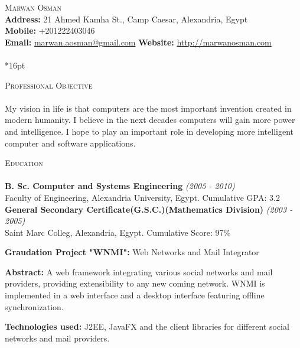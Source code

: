 \documentclass[letterpaper,12pt]{article}
\author{Marwan Osman}
\newcommand{\lineunder}{\vspace*{-8pt} \\ \hspace*{-8pt} \hrulefill \\}
\newcommand{\interval}[1] { \textit{(#1)} }
\newcommand{\header}[1]{{\hspace*{0pt}\vspace*{6pt} \textsc{#1}} \vspace*{-6pt} \lineunder}
\newcommand{\education}[3]{{\textbf{#1} \interval{#2}\\{#3}\\ }}
\newcommand{\objective}[1]{{#1\\\vspace*{8pt}}}
\newcommand{\contact}[3]{
\vspace*{-8pt}
{\LARGE \scshape {#1}}\\
#2 \lineunder 
#3
\vspace*{-8pt}
}
\newenvironment{details}{\vspace*{-4pt} \begin{list}{\topsep 0pt \itemsep -2pt}}{\vspace*{4pt}\end{list}}
\begin{document}
\small
\smallskip
\vspace*{-30pt}

\contact{Marwan Osman}
{\textbf{Address:} 21 Ahmed Kamha St., Camp Caesar, Alexandria, Egypt
\\\textbf{Mobile:} +201222403046
\\\textbf{Email:} \href{mailto:marwan.aosman@gmail.com}{marwan.aosman@gmail.com} \textbf{Website:} \url{http://marwanosman.com}
}

\vspace*{16pt}

\header{Professional Objective}
\objective{ My vision in life is that computers are the most important invention created in modern humanity. I believe in the next decades computers will gain more power and intelligence. I hope to play an important role in developing more intelligent computer and software applications.}

\header{Education}
\education{B. Sc. Computer and Systems Engineering}{2005 - 2010}{Faculty of Engineering, Alexandria University, Egypt. Cumulative GPA: 3.2}
\vspace*{4pt}
\education{General Secondary Certificate(G.S.C.)(Mathematics Division)}{2003 - 2005}{Saint Marc Colleg, Alexandria, Egypt. Cumulative Score: 97\%}
  \begin{details}
    \item \textbf{ Graudation Project "WNMI":} Web Networks and Mail Integrator
    \item \textbf{ Abstract:} A web framework integrating various social networks and mail providers, providing extensibility to any new coming network. WNMI is implemented in a web interface and a desktop interface featuring offline synchronization.
    \item \textbf{ Technologies used:} J2EE, JavaFX and the client libraries for different social networks and mail providers.
  \end{details}
\vspace*{4pt}
\end{document}

